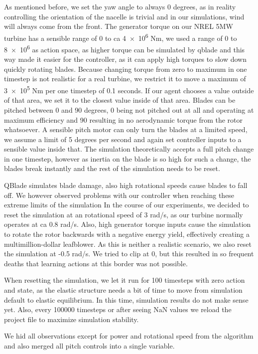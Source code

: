 \documentclass[hyperref,german,beleg]{cgvpub}
\begin{document}
As mentioned before, we set the yaw angle to always 0 degrees, as in reality controlling the orientation of the nacelle is trivial and in our simulations, wind will always come from the front. The generator torque on our NREL 5MW turbine has a sensible range of \num{0} to ca \num{4e6} Nm, we used a range of \num{0} to \num{8e6} as action space, as higher torque can be simulated by qblade and this way made it easier for the controller, as it can apply high torques to slow down quickly rotating blades.
Because changing torque from zero to maximum in one timestep is not realistic for a real turbine, we restrict it to move a maximum of \num{3e5} Nm per one timestep of 0.1 seconds. If our agent chooses a value outside of that area, we set it to the closest value inside of that area.
Blades can be pitched between 0 and 90 degrees, 0 being not pitched out at all and operating at maximum efficiency and 90 resulting in no aerodynamic torque from the rotor whatsoever. A sensible pitch motor can only turn the blades at a limited speed, we assume a limit of 5 degrees per second and again set controller inputs to a sensible value inside that. The simulation theoretically accepts a full pitch change in one timestep, however as inertia on the blade is so high for such a change, the blades break instantly and the rest of the simulation needs to be reset.

QBlade simulates blade damage, also high rotational speeds cause blades to fall off. We however observed problems with our controller when reaching these extreme limits of the simulation In the course of our experiments, we decided to reset the simulation at an rotational speed of 3 rad/s, as our turbine normally operates at ca 0.8 rad/s. Also, high generator torque inputs cause the simulation to rotate the rotor backwards with a negative energy yield, effectively creating a multimillion-dollar leafblower. As this is neither a realistic scenario, we also reset the simulation at -0.5 rad/s. We tried to clip at 0, but this resulted in so frequent deaths that learning actions at this border was not possible.

When resetting the simulation, we let it run for 100 timesteps with zero action and state, as the elastic structure needs a bit of time to move from simulation default to elastic equilibrium. In this time, simulation results do not make sense yet. Also, every 100000 timesteps or after seeing NaN values we reload the project file to maximize simulation stability.

We hid all observations except for power and rotational speed from the algorithm and also merged all pitch controls into a single variable.
\end{document}
